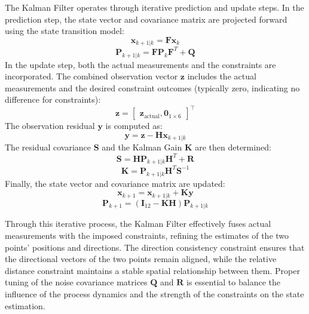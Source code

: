 The Kalman Filter operates through iterative prediction and update steps. In the prediction step, the state vector and covariance matrix are projected forward using the state transition model:
\begin{equation}
\mathbf{x}_{k+1|k} = \mathbf{F} \mathbf{x}_k
\end{equation}
\begin{equation}
\mathbf{P}_{k+1|k} = \mathbf{F} \mathbf{P}_k \mathbf{F}^T + \mathbf{Q}
\end{equation}
In the update step, both the actual measurements and the constraints are incorporated. The combined observation vector $\mathbf{z}$ includes the actual measurements and the desired constraint outcomes (typically zero, indicating no difference for constraints):
\begin{equation}
\mathbf{z} = \begin{bmatrix}
\mathbf{z}_{\text{actual}},
\mathbf{0}_{1 \times 6}
\end{bmatrix}^\top
\end{equation}
The observation residual $\mathbf{y}$ is computed as:
\begin{equation}
\mathbf{y} = \mathbf{z} - \mathbf{H} \mathbf{x}_{k+1|k}
\end{equation}
The residual covariance $\mathbf{S}$ and the Kalman Gain $\mathbf{K}$ are then determined:
\begin{equation}
\mathbf{S} = \mathbf{H} \mathbf{P}_{k+1|k} \mathbf{H}^T + \mathbf{R}
\end{equation}
\begin{equation}
\mathbf{K} = \mathbf{P}_{k+1|k} \mathbf{H}^T \mathbf{S}^{-1}
\end{equation}
Finally, the state vector and covariance matrix are updated:
\begin{equation}
\mathbf{x}_{k+1} = \mathbf{x}_{k+1|k} + \mathbf{K} \mathbf{y}
\end{equation}
\begin{equation}
\mathbf{P}_{k+1} = (\mathbf{I}_{12} - \mathbf{K} \mathbf{H}) \mathbf{P}_{k+1|k}
\end{equation}

Through this iterative process, the Kalman Filter effectively fuses actual measurements with the imposed constraints, refining the estimates of the two points' positions and directions. The direction consistency constraint ensures that the directional vectors of the two points remain aligned, while the relative distance constraint maintains a stable spatial relationship between them. Proper tuning of the noise covariance matrices $\mathbf{Q}$ and $\mathbf{R}$ is essential to balance the influence of the process dynamics and the strength of the constraints on the state estimation.

